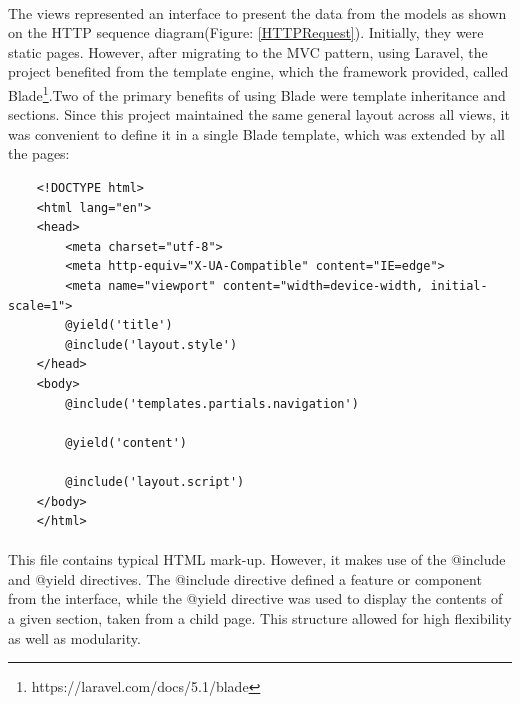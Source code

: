 \documentclass{l4proj}
\begin{document}
\paragraph{}
The views represented an interface to present the data from the models as shown on the HTTP sequence diagram(Figure: \ref{HTTPRequest}). Initially, they were static pages. However, after migrating to the MVC pattern, using Laravel, the project benefited from the template engine, which the framework provided, called Blade\footnote{https://laravel.com/docs/5.1/blade}.Two of the primary benefits of using Blade were template inheritance and sections. Since this project maintained the same general layout across all views, it was convenient to define it in a single Blade template, which was extended by all the pages:
\begin{lstlisting}
	<!DOCTYPE html>
	<html lang="en">
	<head>
		<meta charset="utf-8">
		<meta http-equiv="X-UA-Compatible" content="IE=edge">
		<meta name="viewport" content="width=device-width, initial-scale=1">
		@yield('title')
		@include('layout.style')
	</head>
	<body>
		@include('templates.partials.navigation')
	
		@yield('content')
		
		@include('layout.script')
	</body>
	</html>
\end{lstlisting}
\paragraph{}
This file contains typical HTML mark-up. However, it makes use of the @include and @yield directives. The @include directive defined a feature or component from the interface, while the @yield directive was used to display the contents of a given section, taken from a child page. This structure allowed for high flexibility as well as modularity. 
\end{document}
